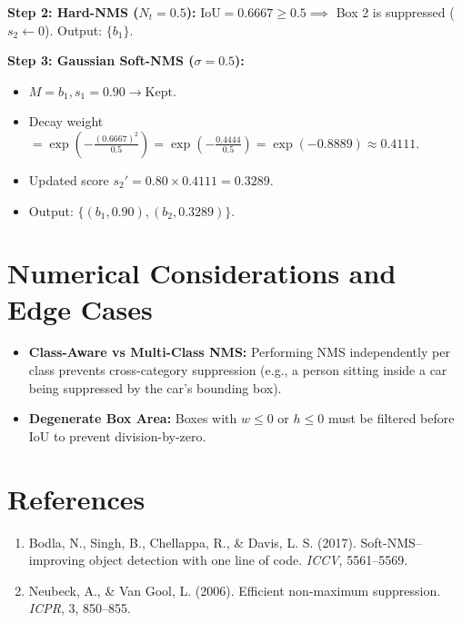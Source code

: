 \documentclass[11pt,a4paper]{article}
\theoremstyle{definition}
\begin{document}
\textbf{Step 2: Hard-NMS ($N_t = 0.5$):}
$\text{IoU} = 0.6667 \ge 0.5 \implies$ Box 2 is suppressed ($s_2 \gets 0$). Output: $\{b_1\}$.

\textbf{Step 3: Gaussian Soft-NMS ($\sigma = 0.5$):}
\begin{itemize}
    \item $M = b_1, s_1 = 0.90 \to \text{Kept}$.
    \item Decay weight $= \exp\left( -\frac{(0.6667)^2}{0.5} \right) = \exp\left(-\frac{0.4444}{0.5}\right) = \exp(-0.8889) \approx 0.4111$.
    \item Updated score $s_2' = 0.80 \times 0.4111 = 0.3289$.
    \item Output: $\{(b_1, 0.90), (b_2, 0.3289)\}$.
\end{itemize}

\section{Numerical Considerations and Edge Cases}

\begin{itemize}
    \item \textbf{Class-Aware vs Multi-Class NMS:} Performing NMS independently per class prevents cross-category suppression (e.g., a person sitting inside a car being suppressed by the car's bounding box).
    \item \textbf{Degenerate Box Area:} Boxes with $w \le 0$ or $h \le 0$ must be filtered before IoU to prevent division-by-zero.
\end{itemize}

\section{References}
\begin{enumerate}
    \item Bodla, N., Singh, B., Chellappa, R., & Davis, L. S. (2017). Soft-NMS--improving object detection with one line of code. \emph{ICCV}, 5561--5569.
    \item Neubeck, A., & Van Gool, L. (2006). Efficient non-maximum suppression. \emph{ICPR}, 3, 850--855.
\end{enumerate}
\end{document}
